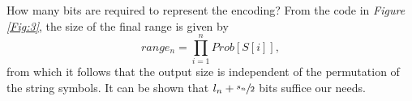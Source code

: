 \documentclass{subfiles}
\begin{document}
        How many bits are required to represent the encoding? 
        From the code in \emph{Figure \ref{Fig:3}},
            the size of the final range is given by 
            \[
                range_{n} = \prod_{i = 1}^{n}{Prob[S[i]]},
            \]
            from which it follows that the output size is independent of the 
            permutation of the string symbols.
        It can be shown that \(l_{n} + \sfrac{s_{n}}{2}\) bits suffice our needs.
\end{document}

